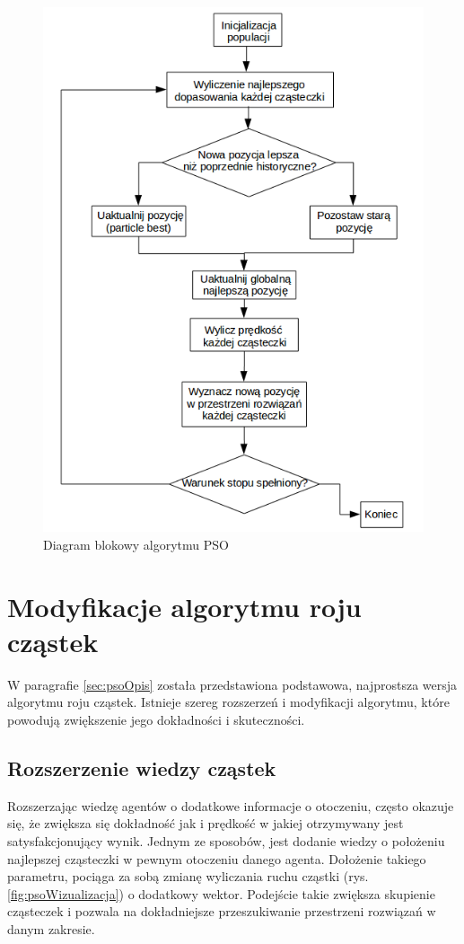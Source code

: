 \begin{figure}[H]
\begin{center} 
\includegraphics[scale=0.6]{tresc/pics/psoDiagram.png}
\caption{Diagram blokowy algorytmu PSO}
\label{fig:psoDiagram}
\end{center}
\end{figure}


\section{Modyfikacje algorytmu roju cząstek}
\label{sec:psoModyfikacje}
W paragrafie \ref{sec:psoOpis} została przedstawiona podstawowa, najprostsza wersja algorytmu roju cząstek. Istnieje szereg rozszerzeń i modyfikacji algorytmu, które powodują zwiększenie jego dokładności i skuteczności.



\subsection{Rozszerzenie wiedzy cząstek}
\label{sec:psoSasiedztwo}
Rozszerzając wiedzę agentów o dodatkowe informacje o otoczeniu, często okazuje się, że zwiększa się dokładność jak i prędkość w jakiej otrzymywany jest satysfakcjonujący wynik. Jednym ze sposobów, jest dodanie wiedzy o położeniu najlepszej cząsteczki w pewnym otoczeniu danego agenta\cite{PSOneighbourhood}. Dołożenie takiego parametru, pociąga za sobą zmianę wyliczania ruchu cząstki (rys. \ref{fig:psoWizualizacja}) o dodatkowy wektor. Podejście takie zwiększa skupienie cząsteczek i pozwala na dokładniejsze przeszukiwanie przestrzeni rozwiązań w danym zakresie. 


